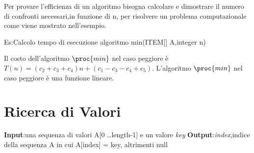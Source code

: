 Per provare l'efficienza di un algoritmo bisogna calcolare e dimostrare il numero di confronti
necessari,in funzione di n, per risolvere un problema computazionale come viene mostrato
nell'esempio.

Es:Calcolo tempo di esecuzione algoritmo min(ITEM[] A,integer n)


Il costo dell'algoritmo $\proc{min}$ nel caso peggiore è $T(n) = (c_2 + c_3 + c_4)n + (c_1 - c_3 - c_4 + c_5)$. \newline
L'algoritmo $\proc{min}$ nel caso peggiore è una funzione lineare.


\section{Ricerca di Valori}
\textbf{Input}:una sequenza di valori A[0 \dots length-1] e un valore \textit{key} \newline
\textbf{Output}:\textit{index},indice della sequenza A in cui A[index] = key, altrimenti null


